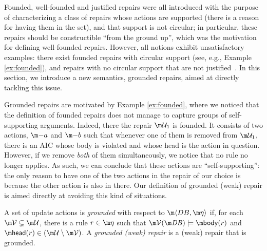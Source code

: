 Founded, well-founded and justified repairs were all introduced with the purpose of characterizing a class of repairs whose actions are supported (there is a reason for having them in the set), and that support is not circular; in particular, these repairs should be constructible ``from the ground up'', which was the motivation for defining well-founded repairs.
However, all notions exhibit unsatisfactory examples: there exist founded repairs with circular support (see, e.g., Example \ref{ex:founded}), and repairs with no circular support that are not justified~\cite{tase/Cruz-FilipeEGN13}. %
In this section, we introduce a new semantics, grounded repairs, aimed at directly tackling this issue. 

Grounded repairs are motivated by Example \ref{ex:founded}, where we noticed that the definition of founded repairs does not manage to capture groups of self-supporting arguments. 
Indeed, there the repair $\UU_1$ is founded. It consists of two actions, $\remove a$ and $\remove b$ such that whenever one of them is removed from $\UU_1$, there is an AIC whose body is violated and whose head is the action in question. 
However, if we remove \emph{both} of them simultaneously, we notice that no rule no longer applies. As such, we can conclude that these actions are ``self-supporting'': the only reason to have one of the two actions in the repair of our choice is because the other action is also in there. 
Our definition of grounded (weak) repair is aimed directly at avoiding this kind of situations. 

\begin{definition}\label{def:grounded}
 A set of update actions \UU is \emph{grounded} with respect to $\fulldb$ if, for each $\VV \subsetneq  \UU$, there is a rule  $r\in \aics$ such that $\VV(\db)\models \body(r)$ and $\head(r)\in(\UU\setminus\VV)$. A \emph{grounded (weak) repair} is a (weak) repair that is grounded.
\end{definition}
  
